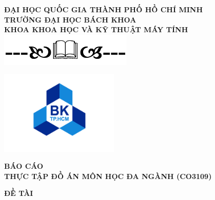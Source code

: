 \begin{titlepage}
    \noindent
    \begin{tcolorbox}[width=16cm, height=24.7cm, colframe=black, colback=white, boxrule=2pt, left=0pt, right=0pt, top=0pt, bottom=0pt]
        \begin{minipage}[t][24.7cm][s]{\linewidth}
            \centering
            {
                \vspace{0.4cm}
                \fontsize{16pt}{19pt}\selectfont
                \textbf{ĐẠI HỌC QUỐC GIA THÀNH PHỐ HỒ CHÍ MINH} \\
                \textbf{TRƯỜNG ĐẠI HỌC BÁCH KHOA} \\
                \textbf{KHOA KHOA HỌC VÀ KỸ THUẬT MÁY TÍNH} \\
                \includegraphics[scale=0.5]{./cover_pages/decor_char.png}
            }

            \vfill
            \includegraphics[height=4cm]{cover_pages/01_logobachkhoasang.png}
            \vfill

            {
                \fontsize{16pt}{19pt}\selectfont
                \textbf{{BÁO CÁO}}                         \\
                \textbf{{THỰC TẬP ĐỒ ÁN MÔN HỌC ĐA NGÀNH (CO3109)}} \\
            }

            \makeatletter
            \vspace{12pt} %
            {\fontsize{16pt}{19pt}\selectfont \textbf{ĐỀ TÀI}}                          \\
            \textbf{{\fontsize{18}{21.6}\selectfont \@title}}
            \vspace{12pt} %
            \makeatother


\end{minipage}
\end{tcolorbox}
\end{titlepage}
